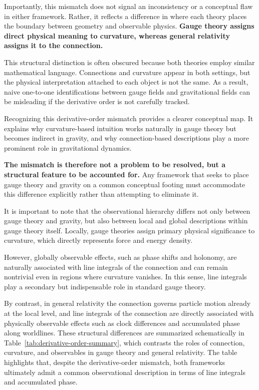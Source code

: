 \documentclass[12pt,letterpaper]{article}
\begin{document}
Importantly, this mismatch does not signal an inconsistency or a conceptual flaw in either framework.  
Rather, it reflects a difference in where each theory places the boundary between geometry and observable physics. \textbf{Gauge theory assigns direct physical meaning to curvature, whereas general relativity assigns it to the connection.}

This structural distinction is often obscured because both theories employ similar mathematical language.  
Connections and curvature appear in both settings, but the physical interpretation attached to each object is not the same. As a result, naive one-to-one identifications between gauge fields and gravitational fields can be misleading if the derivative order is not carefully tracked.

Recognizing this derivative-order mismatch provides a clearer conceptual map. It explains why curvature-based intuition works naturally in gauge theory but becomes indirect in gravity, and why connection-based descriptions play a more prominent role in gravitational dynamics.

\textbf{The mismatch is therefore not a problem to be resolved, but a structural feature to be accounted for.} Any framework that seeks to place gauge theory and gravity on a common conceptual footing must accommodate this difference explicitly rather than attempting to eliminate it.

It is important to note that the observational hierarchy differs not only between gauge theory and gravity, but also between local and global descriptions within gauge theory itself. Locally, gauge theories assign primary physical significance to curvature, which directly represents force and energy density.

However, globally observable effects, such as phase shifts and holonomy, are naturally associated with line integrals of the connection and can remain nontrivial even in regions where curvature vanishes.
In this sense, line integrals play a secondary but indispensable role in standard gauge theory.

By contrast, in general relativity the connection governs particle motion already at the local level, and line integrals of the connection are directly associated with physically observable effects such as clock differences and accumulated phase along worldlines. These structural differences are summarized schematically in Table~\ref{tab:derivative-order-summary}, which contrasts the roles of connection, curvature, and observables in gauge theory and general relativity. The table highlights that, despite the derivative-order mismatch, both frameworks ultimately admit a common observational description in terms of line integrals and accumulated phase.
\end{document}
